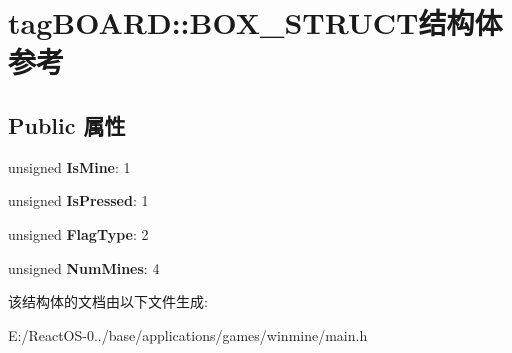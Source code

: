 \hypertarget{structtag_b_o_a_r_d_1_1_b_o_x___s_t_r_u_c_t}{}\section{tag\+B\+O\+A\+RD\+:\+:B\+O\+X\+\_\+\+S\+T\+R\+U\+C\+T结构体 参考}
\label{structtag_b_o_a_r_d_1_1_b_o_x___s_t_r_u_c_t}
\subsection*{Public 属性}
\begin{DoxyCompactItemize}
\item 
\mbox{\label{structtag_b_o_a_r_d_1_1_b_o_x___s_t_r_u_c_t_adfb60a17524b0c0a521e363041a103d2}} 
unsigned {\bfseries Is\+Mine}\+: 1
\item 
\mbox{\label{structtag_b_o_a_r_d_1_1_b_o_x___s_t_r_u_c_t_a6cc9122c684a8e434a96d9a58ca6ad22}} 
unsigned {\bfseries Is\+Pressed}\+: 1
\item 
\mbox{\label{structtag_b_o_a_r_d_1_1_b_o_x___s_t_r_u_c_t_a2e847b11262e87f5c6aea121aa70e222}} 
unsigned {\bfseries Flag\+Type}\+: 2
\item 
\mbox{\label{structtag_b_o_a_r_d_1_1_b_o_x___s_t_r_u_c_t_a47fb327da1366e9b10300ff0727d71d3}} 
unsigned {\bfseries Num\+Mines}\+: 4
\end{DoxyCompactItemize}


该结构体的文档由以下文件生成\+:\begin{DoxyCompactItemize}
\item 
E\+:/\+React\+O\+S-\/0../base/applications/games/winmine/main.\+h\end{DoxyCompactItemize}
